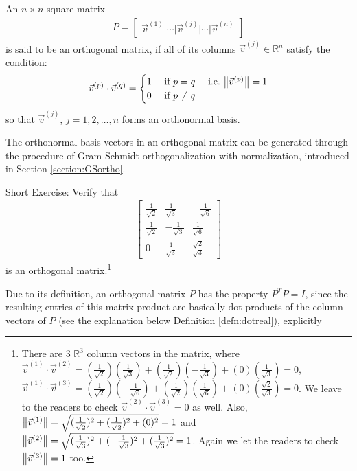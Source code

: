 \begin{defn}
\label{defn:orthomatrix}
An $n \times n$ square matrix
\begin{align*}
P = \begin{bmatrix}
\vec{v}^{(1)}|\cdots|\vec{v}^{(j)}|\cdots|\vec{v}^{(n)}   
\end{bmatrix}
\end{align*}
is said to be an orthogonal matrix, if all of its columns $\vec{v}^{(j)} \in \mathbb{R}^n$ satisfy the condition:
\begin{align*}
\vec{v}^{(p)} \cdot \vec{v}^{(q)} =
\begin{cases}
1 &\text{ if } p = q \quad \text{ i.e.\ } \norm{\vec{v}^{(p)}} = 1 \\
0 &\text{ if } p \neq q    
\end{cases}
\end{align*}
so that $\vec{v}^{(j)}$, $j=1,2,\ldots,n$ forms an orthonormal basis.
\end{defn}
The orthonormal basis vectors in an orthogonal matrix can be generated through the procedure of Gram-Schmidt orthogonalization with normalization, introduced in Section \ref{section:GSortho}.\par
Short Exercise: Verify that 
\begin{align*}
\begin{bmatrix}
\frac{1}{\sqrt{2}} & \frac{1}{\sqrt{3}} & -\frac{1}{\sqrt{6}} \\
\frac{1}{\sqrt{2}} & -\frac{1}{\sqrt{3}} & \frac{1}{\sqrt{6}} \\
0 & \frac{1}{\sqrt{3}} & \frac{\sqrt{2}}{\sqrt{3}}
\end{bmatrix}
\end{align*}
is an orthogonal matrix.\footnote{There are $3$ $\mathbb{R}^3$ column vectors in the matrix, where $\vec{v}^{(1)} \cdot \vec{v}^{(2)} = (\frac{1}{\sqrt{2}})(\frac{1}{\sqrt{3}}) + (\frac{1}{\sqrt{2}})(-\frac{1}{\sqrt{3}}) + (0)(\frac{1}{\sqrt{3}}) = 0$, $\vec{v}^{(1)} \cdot \vec{v}^{(3)} = (\frac{1}{\sqrt{2}})(-\frac{1}{\sqrt{6}}) + (\frac{1}{\sqrt{2}})(\frac{1}{\sqrt{6}}) + (0)(\frac{\sqrt{2}}{\sqrt{3}}) = 0$. We leave to the readers to check $\vec{v}^{(2)} \cdot \vec{v}^{(3)} = 0$ as well. Also, $\norm{\vec{v}^{(1)}} = \sqrt{(\frac{1}{\sqrt{2}})^2 + (\frac{1}{\sqrt{2}})^2 + (0)^2} = 1$ and $\norm{\vec{v}^{(2)}} = \sqrt{(\frac{1}{\sqrt{3}})^2 + (-\frac{1}{\sqrt{3}})^2 + (\frac{1}{\sqrt{3}})^2} = 1$. Again we let the readers to check $\norm{\vec{v}^{(3)}} = 1$ too.}\par
Due to its definition, an orthogonal matrix $P$ has the property $P^TP = I$, since the resulting entries of this matrix product are basically dot products of the column vectors of $P$ (see the explanation below Definition \ref{defn:dotreal}), explicitly
